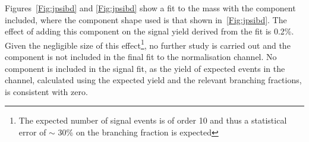 Figures~\ref{Fig:jpsibd}\protect{} and \ref{Fig:jpsibd}\protect{} show a fit to the \Lbpijpsi mass with the \BdToJPsiKst component included, where the component shape used is that shown in~\autoref{Fig:jpsibd}\protect{}. The effect of adding this \BdToJPsiKst component on the \Lbpijpsi signal yield derived from the fit is 0.2\%. Given the negligible size of this effect\footnote{The expected number of \Lbpi signal events is of order 10 and thus a statistical error of $\sim$ 30\%  on the branching fraction is expected}, no further study is carried out and the \BdToJPsiKst component is not included in the final fit to the normalisation channel. No \BdToKstmm component is included in the signal fit, as the yield of expected \BdToKstmm events in the \Lbpi channel, calculated using the expected \BdToJPsiKst yield and the relevant branching fractions, is consistent with zero. 







